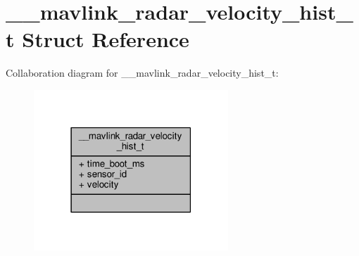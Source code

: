 \hypertarget{struct____mavlink__radar__velocity__hist__t}{\section{\+\_\+\+\_\+mavlink\+\_\+radar\+\_\+velocity\+\_\+hist\+\_\+t Struct Reference}
\label{struct____mavlink__radar__velocity__hist__t}
}


Collaboration diagram for \+\_\+\+\_\+mavlink\+\_\+radar\+\_\+velocity\+\_\+hist\+\_\+t\+:
\nopagebreak
\begin{figure}[H]
\begin{center}
\leavevmode
\includegraphics[width=207pt]{struct____mavlink__radar__velocity__hist__t__coll__graph}
\end{center}
\end{figure}
